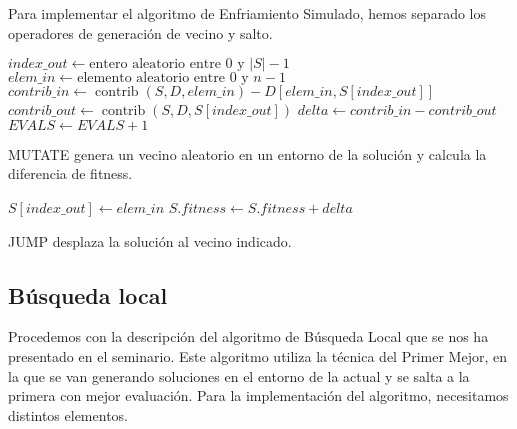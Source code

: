 \documentclass{article}
\begin{document}
Para implementar el algoritmo de Enfriamiento Simulado, hemos separado los operadores de generación de vecino y
salto. 

\begin{algorithm}[H]
	\DontPrintSemicolon %
	$index\_out\gets\text{entero aleatorio entre 0 y $|S|-1$}$\;
	$elem\_in\gets\text{elemento aleatorio entre 0 y $n-1$}$\;
	$contrib\_in\gets\operatorname{contrib}(S,D,elem\_in)-D[elem\_in,S[index\_out]]$
	$contrib\_out\gets\operatorname{contrib}(S,D,S[index\_out])$\;
	$delta\gets contrib\_in-contrib\_out$\;
	$EVALS\gets EVALS+1$\;
	
	\;
	\;
	\;
	\caption{{\sc MUTATE} genera un vecino aleatorio en un entorno de la solución y calcula la diferencia de fitness.}
	\label{alg:mutate-es}
\end{algorithm}

\begin{algorithm}[H]
	\DontPrintSemicolon %
	$S[index\_out]\gets elem\_in$\;
	$S.fitness\gets S.fitness+delta$\;	
	\caption{{\sc JUMP} desplaza la solución al vecino indicado.}
	\label{alg:jump-es}
\end{algorithm}

\pagebreak

\subsection{Búsqueda local}

Procedemos con la descripción del algoritmo de Búsqueda Local que se nos ha presentado en el seminario. 
Este algoritmo utiliza la técnica del Primer Mejor, en la que se van generando soluciones en el entorno de la actual y se
salta a la primera con mejor evaluación. Para la implementación del algoritmo, necesitamos distintos elementos.
\end{document}
